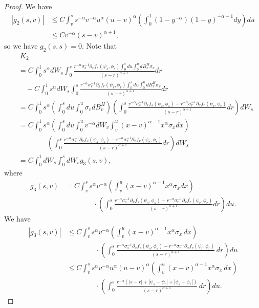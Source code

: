 \documentclass[10pt,a4paper]{amsart}
\begin{document}
\begin{proof}
    We have
    \begin{align*}
        |g_2(s,v)|&\leq C \int_v^s s^{-\alpha} v^{-\alpha}  u^\alpha (u-v)^\alpha \left( \int_0^1 (1-y^{-\alpha})(1-y)^{-\alpha-1} dy\right)  du\\
        &\leq C   v^{-\alpha}(s-v)^{\alpha+1},
    \end{align*}
    so we have $g_2(s,s)=0.$ Note that
      \begin{align*}
        &\ K_2\\
        &=C\int_0^1 s^\alpha dW_s \int_0^s \frac{r^{-\alpha}\sigma_s^{-1}\partial_x f_s(\psi_s,\phi_s)\int_0^s du\int_0^u dB^H_v \sigma_v}{(s-r)^{\alpha+1}}dr\\
        &\quad-C\int_0^1 s^\alpha dW_s \int_0^s \frac{r^{-\alpha}\sigma_r^{-1}\partial_x f_r(\psi_r,\phi_r)\int_0^s du\int_0^u dB^H_v \sigma_v }{(s-r)^{\alpha+1}}dr\\
        &= C\int_0^1 s^\alpha  \left( \int_0^sdu \int_0^u \sigma_v dB^H_v\right) \left(\int_0^s  \frac{r^{-\alpha}\sigma_s^{-1}\partial_x f_s(\psi_s,\phi_s)-r^{-\alpha}\sigma_r^{-1}\partial_x f_r(\psi_r,\phi_r)}{(s-r)^{\alpha+1}} dr\right)dW_s   \\
        &=C \int_0^1 s^\alpha \left(\int_0^sdu \int_0^u v^{-\alpha}dW_v\int_v^u (x-v)^{\alpha-1}x^\alpha \sigma_x dx    \right)\\
        &\qquad\qquad\left(\int_0^s  \frac{r^{-\alpha}\sigma_s^{-1}\partial_x f_s(\psi_s,\phi_s)-r^{-\alpha}\sigma_r^{-1}\partial_x f_r(\psi_r,\phi_r)}{(s-r)^{\alpha+1}} dr\right)dW_s \\
        &=C\int_0^1 dW_s \int_0^s dW_v g_3(s,v),
    \end{align*}
where
\begin{align*}
    g_3(s,v)&=C\int_v^s      s^\alpha  v^{-\alpha}   \left( \int_v^u (x-v)^{\alpha-1}x^\alpha \sigma_x dx \right)\\
    &\qquad\qquad\cdot\left(\int_0^s  \frac{r^{-\alpha}\sigma_s^{-1}\partial_x f_s(\psi_s,\phi_s)-r^{-\alpha}\sigma_r^{-1}\partial_x f_r(\psi_r,\phi_r)}{(s-r)^{\alpha+1}} dr\right)du.
\end{align*}
   We have
\begin{align*}
    |g_3(s,v)| &\leq C \int_v^s s^\alpha v^{-\alpha} \left( \int_v^u (x-v)^{\alpha-1} x^\alpha \sigma_x \, dx \right) \\
    &\qquad\qquad \cdot \left( \int_0^s \frac{r^{-\alpha} \sigma_s^{-1} \partial_x f_s(\psi_s, \phi_s) - r^{-\alpha} \sigma_r^{-1} \partial_x f_r(\psi_r, \phi_r)}{(s - r)^{\alpha + 1}} \, dr \right) du \\
    &\leq C \int_v^s s^\alpha v^{-\alpha} u^\alpha (u - v)^\alpha \left( \int_v^u (x - v)^{\alpha - 1} x^\alpha \sigma_x \, dx \right) \\
    &\qquad\qquad \cdot \left( \int_0^s \frac{r^{-\alpha} (|s - r| + |\psi_s - \psi_r| + |\phi_s - \phi_r|)}{(s - r)^{\alpha + 1}} \, dr \right) du.
\end{align*}


\end{proof}
\end{document}
